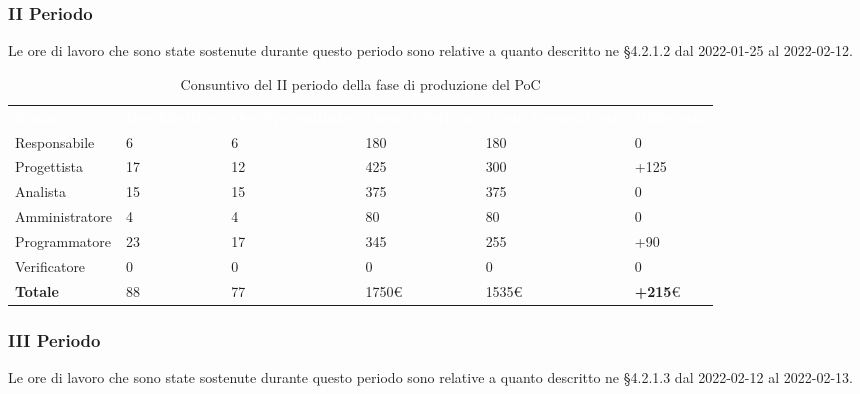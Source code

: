 \subsubsection{II Periodo}
Le ore di lavoro che sono state sostenute durante questo periodo sono relative a quanto descritto ne §4.2.1.2 dal 2022-01-25 al 2022-02-12.

\begin{table}[H]
\begin{center}
\renewcommand{\arraystretch}{1.5}
\begin{tabular}{ m{}<{\centering}  m{}<{\centering} m{}<{\centering} m{}<{\centering} m{}<{\centering} m{}<{\centering}}
	\rowcolor{darkblue}
	\textcolor{white}{\textbf{Ruolo}} & \textcolor{white}{\textbf{Ore Effettive}} & \textcolor{white}{\textbf{Ore Preventivate}}&\textcolor{white}{\textbf{Costo Effettivo}}&\textcolor{white}{\textbf{Costo Preventivato}}&\textcolor{white}{\textbf{Differenza}}\\ 
	
	Responsabile  & 6 & 6 & 180 & 180 & 0 \\	
	
	Progettista & 17 & 12 & 425 & 300 & +125 \\
	
	Analista & 15 & 15 & 375 & 375 & 0 \\

	Amministratore & 4 & 4 & 80 & 80 & 0 \\
	
	Programmatore & 23 & 17 & 345 & 255 & +90 \\
	
	Verificatore & 0 & 0 & 0 & 0 & 0 \\
	
	\textbf{Totale} & 88 & 77 & 1750\euro & 1535\euro & \textbf{+215}\euro \\
	
\end{tabular}
\caption{Consuntivo del II periodo della fase di produzione del PoC}
\end{center}
\end{table}


\subsubsection{III Periodo}
Le ore di lavoro che sono state sostenute durante questo periodo sono relative a quanto descritto ne §4.2.1.3 dal 2022-02-12 al 2022-02-13.


